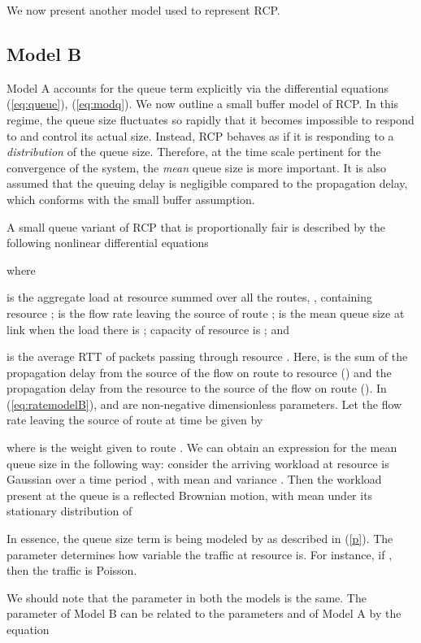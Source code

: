 \documentclass[conference]{IEEEtran}
\begin{document}
We now present another model used to represent RCP.

\subsection{Model B}
Model A accounts for the queue term explicitly via the differential equations (\ref{eq:queue}), (\ref{eq:modq}).
We now outline a small buffer model of RCP. In this regime, the queue size fluctuates so rapidly that it becomes impossible to respond to and 
control its actual size. Instead, RCP behaves as if it is responding to a \emph{ 
distribution} of the queue size. Therefore, at the time scale pertinent for the convergence of
the system, the \textit{mean} queue size is more important. It is also assumed that the queuing delay is negligible 
compared to the propagation delay, which conforms with the small buffer assumption.

A small queue variant of RCP that is proportionally fair is described by the following 
nonlinear differential equations \cite{krv}   


where 

is the aggregate load at resource  summed over all the routes, , containing resource ; 
 is the flow rate leaving the source of route ;  
is the mean queue size at link  when the load there is ; capacity of resource  is ; and

is the average RTT of packets passing through resource . Here, 
 is the sum of the propagation delay from the source of the flow on route  to resource  () 
and the propagation delay from the resource  to the source of the flow on route  (). In (\ref{eq:ratemodelB}),  and  are non-negative dimensionless parameters. Let the flow rate
  leaving the source of route  at time  be given by


where  is the weight given to route .
We can obtain an expression for the mean queue size in the following way: consider the 
arriving workload at resource  is Gaussian over a time period , with mean 
 and variance . Then the workload present at the queue 
is a reflected Brownian motion, with mean under its stationary distribution of



In essence, 
the queue size term is being modeled by  as described 
in (\ref{p}). The parameter  determines how variable the 
traffic at resource  is. For instance, if , then the traffic is Poisson. 

We should note that the parameter  in both the models is the same. The parameter  of 
Model B can be related to the parameters  and  of Model A by the equation
\end{document}
